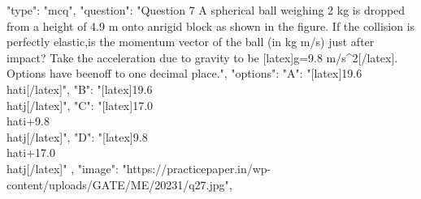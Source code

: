   {
    "type": "mcq",
    "question": "Question 7 A spherical ball weighing 2 kg is dropped from a height of 4.9 m onto an\nimmovable rigid block as shown in the figure. If the collision is perfectly elastic,\nwhat is the momentum vector of the ball (in kg m/s) just after impact? Take the acceleration due to gravity to be [latex]g=9.8 m/s^2[/latex]. Options have been\nrounded off to one decimal place.",
    "options": {
      "A": "[latex]19.6\\hat{i}[/latex]",
      "B": "[latex]19.6\\hat{j}[/latex]",
      "C": "[latex]17.0\\hat{i}+9.8\\hat{j}[/latex]",
      "D": "[latex]9.8\\hat{i}+17.0\\hat{j}[/latex]"
    },
    "image": "https://practicepaper.in/wp-content/uploads/GATE/ME/20231/q27.jpg",
}
